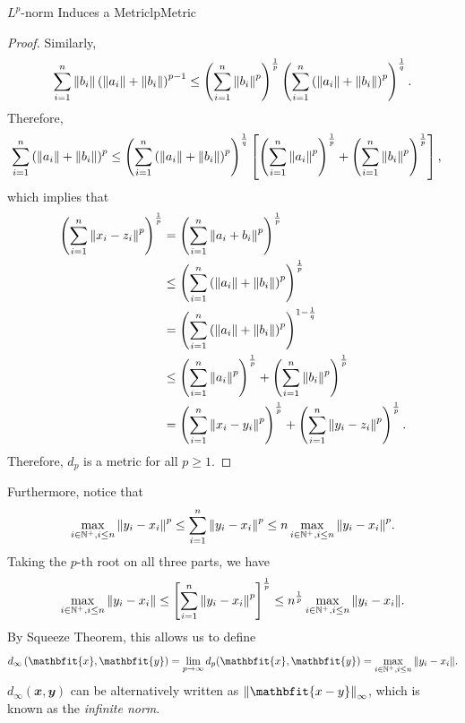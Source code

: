 \documentclass[math]{amznotes}
\theoremstyle{remark}
\begin{document}
\begin{probox}{$L^p$-norm Induces a Metric}{lpMetric}
\begin{proof}
        Similarly, 
        \begin{equation*}
            \sum_{i=1}^n {\left\lVert {b_i} \right\rVert}\left({\left\lVert {a_i} \right\rVert} + {\left\lVert {b_i} \right\rVert}\right)^{p - 1} \leq \left(\sum_{i=1}^n {\left\lVert {b_i} \right\rVert}^p\right)^{\frac{1}{p}}\left(\sum_{i = 1}^{n}\left({\left\lVert {a_i} \right\rVert} + {\left\lVert {b_i} \right\rVert}\right)^{p}\right)^{\frac{1}{q}}.
        \end{equation*}
        Therefore, 
        \begin{align*}
            \sum_{i=1}^n \left({\left\lVert {a_i} \right\rVert} + {\left\lVert {b_i} \right\rVert}\right)^p & \leq \left(\sum_{i = 1}^{n}\left({\left\lVert {a_i} \right\rVert} + {\left\lVert {b_i} \right\rVert}\right)^{p}\right)^{\frac{1}{q}}\left[\left(\sum_{i=1}^n {\left\lVert {a_i} \right\rVert}^p\right)^{\frac{1}{p}} + \left(\sum_{i=1}^n {\left\lVert {b_i} \right\rVert}^p\right)^{\frac{1}{p}}\right],
        \end{align*}
        which implies that 
        \begin{align*}
            \left( \sum_{i=1}^n {\left\lVert {x_i - z_i} \right\rVert}^p \right)^{\frac{1}{p}} & = \left( \sum_{i=1}^n {\left\lVert {a_i + b_i} \right\rVert}^p \right)^{\frac{1}{p}} \\
            & \leq \left( \sum_{i=1}^n \left({\left\lVert {a_i} \right\rVert} + {\left\lVert {b_i} \right\rVert}\right)^p \right)^{\frac{1}{p}} \\
            & = \left(\sum_{i=1}^n \left({\left\lVert {a_i} \right\rVert} + {\left\lVert {b_i} \right\rVert}\right)^p\right)^{1 - \frac{1}{q}} \\
            & \leq \left(\sum_{i=1}^n {\left\lVert {a_i} \right\rVert}^p\right)^{\frac{1}{p}} + \left(\sum_{i=1}^n {\left\lVert {b_i} \right\rVert}^p\right)^{\frac{1}{p}} \\
            & = \left( \sum_{i=1}^n {\left\lVert {x_i - y_i} \right\rVert}^p \right)^{\frac{1}{p}} + \left( \sum_{i=1}^n {\left\lVert {y_i - z_i} \right\rVert}^p \right)^{\frac{1}{p}}.
        \end{align*}
        Therefore, $d_p$ is a metric for all $p \geq 1$.
    \end{proof}
\end{probox}
Furthermore, notice that
\begin{equation*}
    \max_{i \in \mathbb{N}^+, i \leq n}{\left\lVert {y_i - x_i} \right\rVert}^p \leq \sum_{i = 1}^{n}{\left\lVert {y_i - x_i} \right\rVert}^p \leq n\max_{i \in \mathbb{N}^+, i \leq n}{\left\lVert {y_i - x_i} \right\rVert}^p.
\end{equation*}
Taking the $p$-th root on all three parts, we have
\begin{equation*}
    \max_{i \in \mathbb{N}^+, i \leq n}{\left\lVert {y_i - x_i} \right\rVert} \leq \left[\sum_{i = 1}^{n}{\left\lVert {y_i - x_i} \right\rVert}^p\right]^{\frac{1}{p}} \leq n^{\frac{1}{p}}\max_{i \in \mathbb{N}^+, i \leq n}{\left\lVert {y_i - x_i} \right\rVert}.
\end{equation*}
By Squeeze Theorem, this allows us to define
\begin{equation*}
    d_\infty\left(\mathbfit{x}, \mathbfit{y}\right) = \lim_{p \to \infty}d_p(\mathbfit{x}, \mathbfit{y}) = \max_{i \in \N^+, i \leq n}\norm{y_i - x_i}.
\end{equation*}
$d_\infty\left(\mathbfit{x}, \mathbfit{y}\right)$ can be alternatively written as $\norm{\mathbfit{x - y}}_\infty$, which is known as the \textit{infinite norm}.
\end{document}
